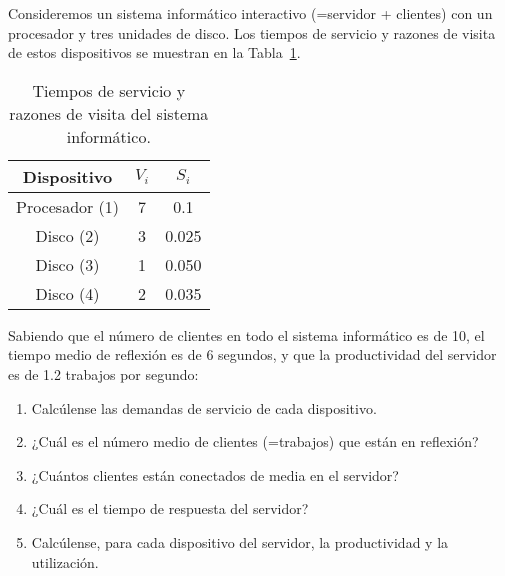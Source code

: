 \begin{ejercicio}\label{ej:5.11}
    Consideremos un sistema informático interactivo (=servidor + clientes) con un procesador y tres unidades de disco. Los tiempos de servicio y razones de visita de estos dispositivos se muestran en la Tabla~\ref{tab:5.11}.
    \begin{table}[h]
        \centering
        \begin{tabular}{|c|c|c|}
            \hline
            Dispositivo & $V_i$ & $S_i$ \\
            \hline
            Procesador (1) & 7 & 0.1 \\
            Disco (2) & 3 & 0.025 \\
            Disco (3) & 1 & 0.050 \\
            Disco (4) & 2 & 0.035 \\
            \hline
        \end{tabular}
        \caption{Tiempos de servicio y razones de visita del sistema informático.}
        \label{tab:5.11}
    \end{table}
    Sabiendo que el número de clientes en todo el sistema informático es de 10, el tiempo medio de reflexión es de 6 segundos, y que la productividad del servidor es de 1.2 trabajos por segundo:
    \begin{enumerate}
        \item Calcúlense las demandas de servicio de cada dispositivo.
        \item ¿Cuál es el número medio de clientes (=trabajos) que están en reflexión?
        \item ¿Cuántos clientes están conectados de media en el servidor?
        \item ¿Cuál es el tiempo de respuesta del servidor?
        \item Calcúlense, para cada dispositivo del servidor, la productividad y la utilización.
    \end{enumerate}
\end{ejercicio}
\begin{comment}
\solucion
    \begin{enumerate}
        \item $D_1 = 0.7$, $D_2 = 0.075$, $D_3 = 0.05$, $D_4 = 0.07$ (expresados en segundos o segundos/trabajo).
        \item Hay 7.2 trabajos (clientes) en reflexión.
        \item En el servidor hay una media de 2.8 clientes conectados.
        \item El tiempo medio de respuesta es 2.3 segundos.
        \item Productividades: $X_1 = 8.4$, $X_2 = 3.6$, $X_3 = 1.2$, $X_4 = 2.4$ (expresados en trabajos/s). Utilizaciones: $U_1 = 0.84$, $U_2 = 0.09$, $U_3 = 0.06$, $U_4 = 0.08$.
    \end{enumerate}
\end{comment}

